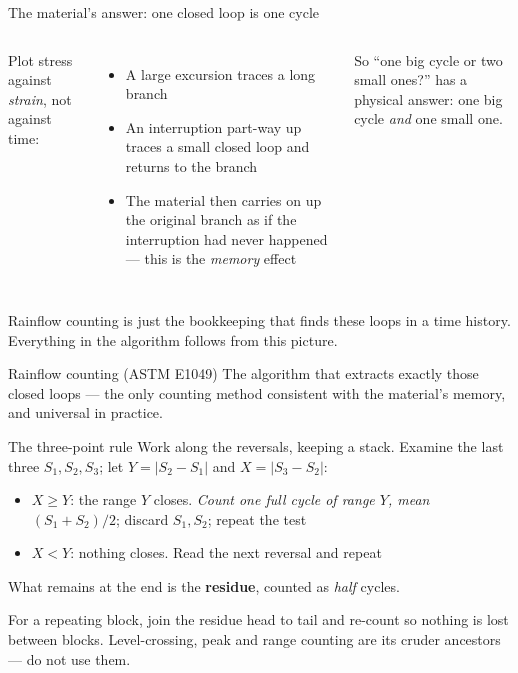 \documentclass[aspectratio=169,10pt]{beamer}
\begin{document}
\begin{frame}{The material's answer: one closed loop is one cycle}
\begin{columns}[T]
\centering
\scalebox{0.78}{}
\footnotesize
Plot stress against \emph{strain}, not against time:
\begin{itemize}
  \item A large excursion traces a long branch
  \item An interruption part-way up traces a \alert{small closed loop} and returns to the branch
  \item The material then carries on up the original branch \alert{as if the interruption had never happened} --- this is the \emph{memory} effect
\end{itemize}
\vspace{2pt}
So ``one big cycle or two small ones?'' has a physical answer: \alert{one big cycle \emph{and} one small one}.
\end{columns}
\vspace{2pt}
\begin{alertblock}{}
\footnotesize Rainflow counting is just the bookkeeping that finds these loops in a time history. Everything in the algorithm follows from this picture.
\end{alertblock}
\end{frame}

\begin{frame}{Rainflow counting (ASTM E1049)}
The algorithm that extracts exactly those closed loops --- the only counting method consistent with the material's memory, and universal in practice.
\vspace{4pt}
\begin{block}{The three-point rule}
Work along the reversals, keeping a stack. Examine the last three $S_1,S_2,S_3$; let $Y=|S_2-S_1|$ and $X=|S_3-S_2|$:
\begin{itemize}\footnotesize
  \item \alert{$X\ge Y$}: the range $Y$ closes. \emph{Count one full cycle of range $Y$, mean $(S_1+S_2)/2$}; discard $S_1,S_2$; repeat the test
  \item \alert{$X<Y$}: nothing closes. Read the next reversal and repeat
\end{itemize}
What remains at the end is the \textbf{residue}, counted as \emph{half} cycles.
\end{block}
\vspace{2pt}
\footnotesize For a repeating block, join the residue head to tail and re-count so nothing is lost between blocks. Level-crossing, peak and range counting are its cruder ancestors --- do not use them.
\end{frame}
\end{document}
